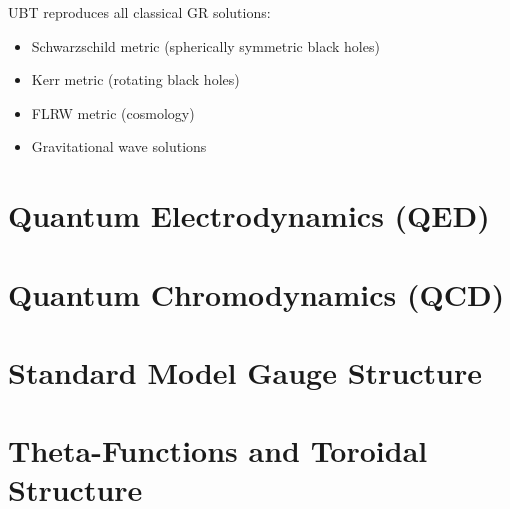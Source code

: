 \documentclass[12pt,a4paper]{article}
\begin{document}
UBT reproduces all classical GR solutions:

\begin{itemize}
    \item Schwarzschild metric (spherically symmetric black holes)
    \item Kerr metric (rotating black holes)
    \item FLRW metric (cosmology)
    \item Gravitational wave solutions
\end{itemize}



\section{Quantum Electrodynamics (QED)}
\label{sec:qed}




\section{Quantum Chromodynamics (QCD)}
\label{sec:qcd}




\section{Standard Model Gauge Structure}
\label{sec:sm_gauge}




\section{Theta-Functions and Toroidal Structure}
\label{sec:theta_functions}
\end{document}
